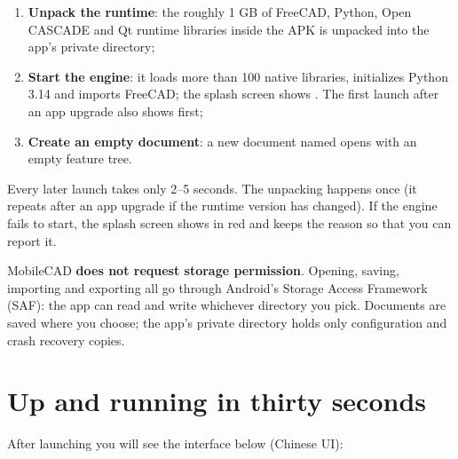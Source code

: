 \begin{enumerate}
  \item \textbf{Unpack the runtime}: the roughly 1 GB of FreeCAD, Python, Open CASCADE and Qt runtime
        libraries inside the APK is unpacked into the app's private directory;
  \item \textbf{Start the engine}: it loads more than 100 native libraries, initializes Python 3.14 and
        imports FreeCAD; the splash screen shows . The first launch after an app
        upgrade also shows  first;
  \item \textbf{Create an empty document}: a new document named  opens with an empty feature tree.
\end{enumerate}

Every later launch takes only 2--5 seconds. The unpacking happens once (it repeats after an app upgrade if the
runtime version has changed). If the engine fails to start, the splash screen shows  in red and keeps the reason so that you can report it.

\begin{tip}
MobileCAD \textbf{does not request storage permission}. Opening, saving, importing and exporting all go through
Android's Storage Access Framework (SAF): the app can read and write whichever directory you pick. Documents
are saved where you choose; the app's private directory holds only configuration and crash recovery copies.
\end{tip}

\section{Up and running in thirty seconds}

After launching you will see the interface below (Chinese UI):


